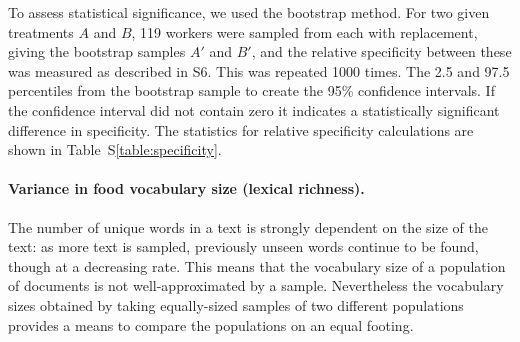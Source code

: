\documentclass[12pt]{article}
\begin{document}
To assess statistical significance, we used the bootstrap method.
For two given treatments $A$ and $B$, 
119 workers were sampled from each with replacement, giving the bootstrap
samples $A'$ and $B'$, and the relative specificity between these 
was measured as described in \textsection S6.
This was repeated 1000 times.  The 2.5 and 97.5 percentiles from the 
bootstrap sample to create the 95\% confidence intervals.  If the confidence
interval did not contain zero it indicates a statistically significant 
difference in specificity.  The statistics for relative specificity 
calculations are shown in Table~S\ref{table:specificity}.

\begin{table}
\caption{Relative specificity ($S$) of food-related words between the food- 
	and non-food-exposed treatments of all experiments. 
	Positive values indicates the food-exposed treatment was relatively more
	specific; boldfaced values indicate a disparity in specificity that 
	is statistically significant.  
	$S^*_\mathrm{lowCI}, S^*_\mathrm{upCI}$: lower and upper
	confidence intervals for $S$ based on the bootstrapping approach.  All
values are expressed as percentages.}
\label{table:specificity}
\end{table}




	\paragraph{Variance in food vocabulary size (lexical richness).}
	The number of unique words in a text is strongly dependent on the size
	of the text: as more text is sampled, previously unseen words continue
	to be found, though at a decreasing rate.  
	This means that the vocabulary size of a population of documents is 
	not well-approximated by a sample.  Nevertheless the vocabulary sizes
	obtained by taking equally-sized samples of two different populations
	provides a means to compare the populations on an equal footing.
\end{document}
